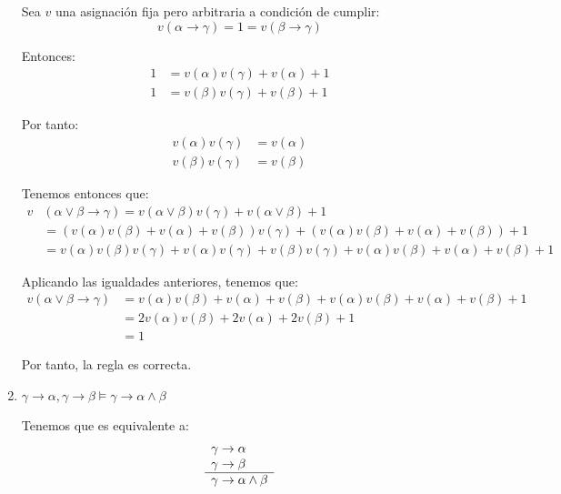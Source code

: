 \begin{ejercicio*}
\begin{enumerate}
        Sea $v$ una asignación fija pero arbitraria a condición de cumplir:
        \begin{equation*}
            v(\alpha\rightarrow\gamma)=1=v(\beta\rightarrow\gamma)
        \end{equation*}

        Entonces:
        \begin{align*}
            1 &= v(\alpha)v(\gamma)+v(\alpha)+1\\
            1 &= v(\beta)v(\gamma)+v(\beta)+1
        \end{align*}

        Por tanto:
        \begin{align*}
            v(\alpha)v(\gamma) &= v(\alpha) \\
            v(\beta)v(\gamma) &= v(\beta)
        \end{align*}

        Tenemos entonces que:
        \begin{align*}
            v &(\alpha\lor\beta\rightarrow\gamma)
            = v(\alpha\lor\beta)v(\gamma)+v(\alpha\lor\beta)+1\\
            &= (v(\alpha)v(\beta)+v(\alpha)+v(\beta))v(\gamma) + (v(\alpha)v(\beta)+v(\alpha)+v(\beta))+1\\
            &= v(\alpha)v(\beta)v(\gamma)+v(\alpha)v(\gamma)+v(\beta)v(\gamma) + v(\alpha)v(\beta)+v(\alpha)+v(\beta)+1
        \end{align*}

        Aplicando las igualdades anteriores, tenemos que:
        \begin{align*}
            v (\alpha\lor\beta\rightarrow\gamma)
            &= v(\alpha)v(\beta)+v(\alpha)+v(\beta) + v(\alpha)v(\beta)+v(\alpha)+v(\beta)+1 \\
            &= 2v(\alpha)v(\beta)+2v(\alpha)+2v(\beta)+1 \\
            &= 1
        \end{align*}

        Por tanto, la regla es correcta.

        \item $\gamma\rightarrow\alpha, \gamma\rightarrow\beta \models \gamma\rightarrow\alpha\land\beta$

        Tenemos que es equivalente a:
        \begin{equation*}
            \begin{array}{l}
                \gamma\rightarrow\alpha\\
                \gamma\rightarrow\beta\\ \hline
                \multicolumn{1}{c}{\gamma\rightarrow\alpha\land\beta}
            \end{array}
        \end{equation*}


\end{enumerate}
\end{ejercicio*}
